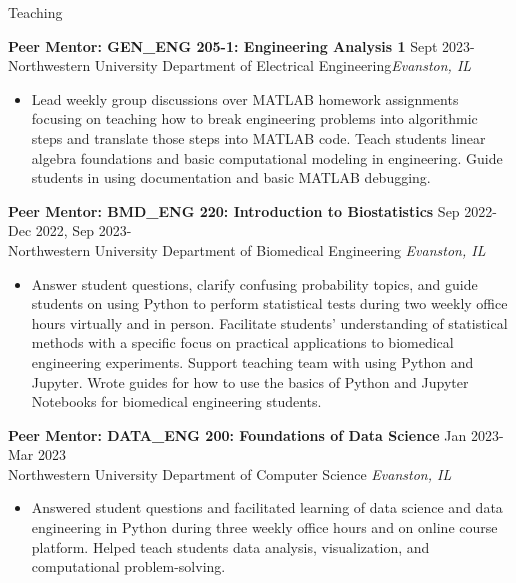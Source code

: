 \documentclass{resume} %
\begin{document}

\begin{rSection}{Teaching}

\textbf{Peer Mentor: GEN\_ENG 205-1: Engineering Analysis 1} \hfill Sept 2023-\\
Northwestern University Department of Electrical Engineering\hfill \textit{Evanston, IL}
 \begin{itemize}
    \itemsep -3pt {}
        \item[] Lead weekly group discussions over MATLAB homework assignments focusing on teaching how to break engineering problems into algorithmic steps and translate those steps into MATLAB code.
        Teach students linear algebra foundations and basic computational modeling in engineering.
        Guide students in using documentation and basic MATLAB debugging.
 \end{itemize}
 
\textbf{Peer Mentor: BMD\_ENG 220: Introduction to Biostatistics} \hfill Sep 2022-Dec 2022, Sep 2023-\\
Northwestern University Department of Biomedical Engineering \hfill \textit{Evanston, IL}
 \begin{itemize}
    \itemsep -3pt {} 
    \item[] Answer student questions, clarify confusing probability topics, and guide students on using Python to perform statistical tests during two weekly office hours virtually and in person.
    Facilitate students' understanding of statistical methods with a specific focus on practical applications to biomedical engineering experiments.
    Support teaching team with using Python and Jupyter.
    Wrote guides for how to use the basics of Python and Jupyter Notebooks for biomedical engineering students.
 \end{itemize}

\textbf{Peer Mentor: DATA\_ENG 200: Foundations of Data Science} \hfill Jan 2023-Mar 2023\\
Northwestern University Department of Computer Science \hfill \textit{Evanston, IL}
 \begin{itemize}
    \itemsep -3pt {}
        \item[] Answered student questions and facilitated learning of data science and data engineering in Python during three weekly office hours and on online course platform.
        Helped teach students data analysis, visualization, and computational problem-solving.
 \end{itemize}

\end{rSection} 
\end{document}
